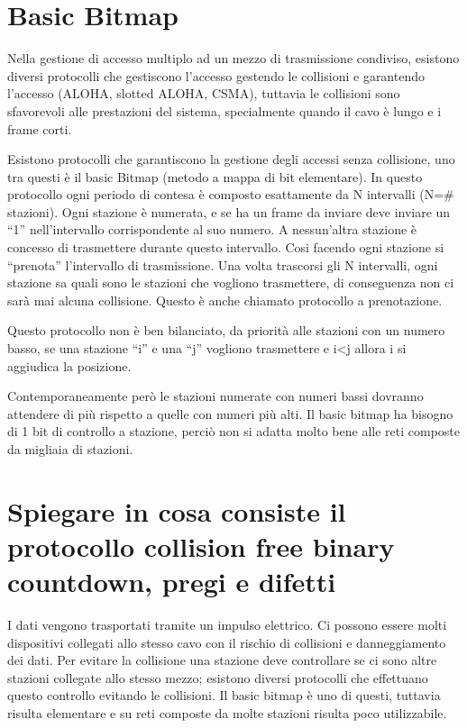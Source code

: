 \section{Basic Bitmap}

Nella gestione di accesso multiplo ad un mezzo di trasmissione condiviso, esistono diversi protocolli che gestiscono l’accesso gestendo le collisioni e garantendo l’accesso (ALOHA, slotted ALOHA, CSMA), tuttavia le collisioni sono sfavorevoli alle prestazioni del sistema, specialmente quando il cavo è lungo e i frame corti.

Esistono protocolli che garantiscono la gestione degli accessi senza collisione, uno tra questi è il basic Bitmap (metodo a mappa di bit elementare). In questo protocollo ogni periodo di contesa è composto esattamente da N intervalli (N=\# stazioni). Ogni stazione è numerata, e se ha un frame da inviare deve inviare un “1” nell’intervallo corrispondente al suo numero. A nessun’altra stazione è concesso di trasmettere durante questo intervallo. Cosi facendo ogni stazione si “prenota” l’intervallo di trasmissione. Una volta trascorsi gli N intervalli, ogni stazione sa quali sono le stazioni che vogliono trasmettere, di conseguenza non ci sarà mai alcuna collisione.
Questo è anche chiamato protocollo a prenotazione.

Questo protocollo non è ben bilanciato, da priorità alle stazioni con un numero basso, se una stazione “i” e una “j” vogliono trasmettere e i<j allora i si aggiudica la posizione.

Contemporaneamente però le stazioni numerate con numeri bassi dovranno attendere di più rispetto a quelle con numeri più alti.
Il basic bitmap ha bisogno di 1 bit di controllo a stazione, perciò non si adatta molto bene alle reti composte da migliaia di stazioni.

\section{Spiegare in cosa consiste il protocollo collision free binary countdown, pregi e difetti}

I dati vengono trasportati tramite un impulso elettrico. Ci possono essere molti dispositivi collegati allo stesso cavo con il rischio di collisioni e danneggiamento dei dati.
Per evitare la collisione una stazione deve controllare se ci sono altre stazioni collegate allo stesso mezzo; esistono diversi protocolli che effettuano questo controllo evitando le collisioni.
Il basic bitmap è uno di questi, tuttavia risulta elementare e su reti composte da molte stazioni risulta poco utilizzabile.

